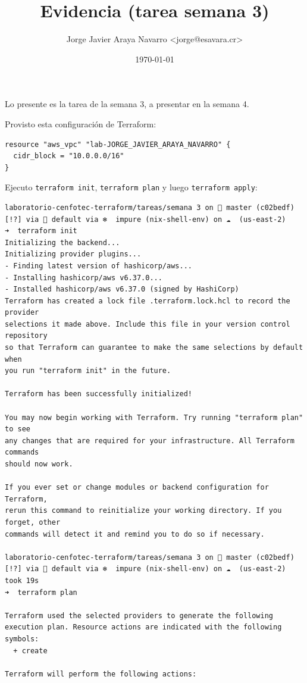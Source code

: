 \documentclass[11pt]{article}
\author{Jorge Javier Araya Navarro <jorge@esavara.cr>}
\date{\today}
\title{Evidencia (tarea semana 3)}
\begin{document}
\maketitle
\tableofcontents

Lo presente es la tarea de la semana 3, a presentar en la semana 4.

Provisto esta configuración de Terraform:

\begin{verbatim}
resource "aws_vpc" "lab-JORGE_JAVIER_ARAYA_NAVARRO" {
  cidr_block = "10.0.0.0/16"
}
\end{verbatim}

Ejecuto \texttt{terraform init}, \texttt{terraform plan} y luego \texttt{terraform apply}:

\begin{verbatim}
laboratorio-cenfotec-terraform/tareas/semana 3 on  master (c02bedf) [!?] via 💠 default via ❄  impure (nix-shell-env) on ☁  (us-east-2)
➜  terraform init
Initializing the backend...
Initializing provider plugins...
- Finding latest version of hashicorp/aws...
- Installing hashicorp/aws v6.37.0...
- Installed hashicorp/aws v6.37.0 (signed by HashiCorp)
Terraform has created a lock file .terraform.lock.hcl to record the provider
selections it made above. Include this file in your version control repository
so that Terraform can guarantee to make the same selections by default when
you run "terraform init" in the future.

Terraform has been successfully initialized!

You may now begin working with Terraform. Try running "terraform plan" to see
any changes that are required for your infrastructure. All Terraform commands
should now work.

If you ever set or change modules or backend configuration for Terraform,
rerun this command to reinitialize your working directory. If you forget, other
commands will detect it and remind you to do so if necessary.

laboratorio-cenfotec-terraform/tareas/semana 3 on  master (c02bedf) [!?] via 💠 default via ❄  impure (nix-shell-env) on ☁  (us-east-2) took 19s
➜  terraform plan

Terraform used the selected providers to generate the following execution plan. Resource actions are indicated with the following symbols:
  + create

Terraform will perform the following actions:


\end{verbatim}
\end{document}
